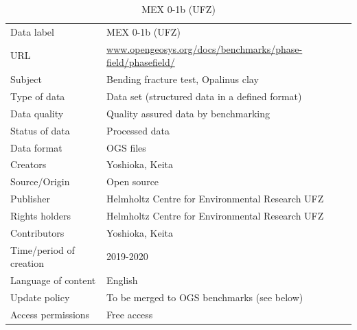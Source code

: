 \begin{table}[!ht]
\caption{MEX 0-1b (UFZ)}
\label{tab:dms-mex0-1a}
\small
\begin{tabular}{R{3.5cm}|L{7.5cm}}
\hline
%
Data label & MEX 0-1b (UFZ) \\
URL & \url{www.opengeosys.org/docs/benchmarks/phase-field/phasefield/} \\ 
Subject  & Bending fracture test, Opalinus clay \\
Type of data  & Data set (structured data in a defined format) \\
Data quality  & Quality assured data by benchmarking \\
Status of data  & Processed data \\
Data format  & OGS files \\
Creators  & Yoshioka, Keita  \\
Source/Origin & Open source \\
Publisher  & Helmholtz Centre for Environmental Research UFZ \\
Rights holders & Helmholtz Centre for Environmental Research UFZ \\
Contributors & Yoshioka, Keita \\
Time/period of creation & 2019-2020 \\
Language of content & English \\
Update policy & To be merged to OGS benchmarks (see below) \\
Access permissions & Free access \\
%
\hline
\end{tabular}
\end{table}
